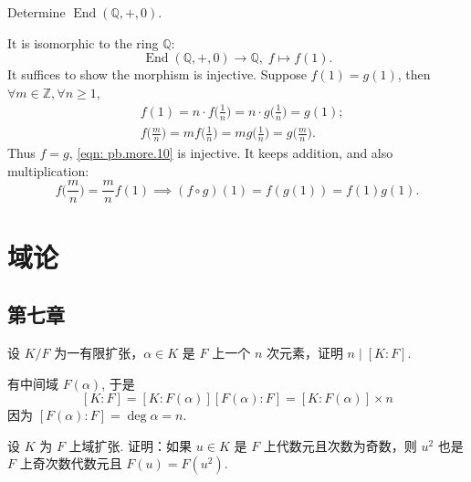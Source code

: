 \setcounter{pb}{10}
\begin{problem}
    Determine $\operatorname{End}(\mathbb{Q},+,0)$.
\end{problem}

\begin{solution}
    It is isomorphic to the ring $\mathbb{Q}$:
        \begin{equation}
            \label{eqn: pb.more.10}
            \operatorname{End}(\mathbb{Q},+,0) \to \mathbb{Q},\; f\mapsto f(1). 
        \end{equation}
    It suffices to show the morphism is injective.  Suppose $f(1)=g(1)$, then $\forall m\in\mathbb{Z},\forall n\geq1  $, 
        \[
            \begin{split}
                & f(1)=n\cdot f\Big(\frac{1}{n}\Big)=n\cdot g\Big(\frac{1}{n}\Big)=g(1);\\
                & f\Big(\frac{m}{n}\Big)=m f\Big(\frac{1}{n}\Big)=m g\Big(\frac{1}{n}\Big)=g\Big(\frac{m}{n}\Big).
            \end{split}
        \]
    Thus $f=g$, \eqref{eqn: pb.more.10} is injective. 
    It keeps addition, and also multiplication:
        \[
            f\Big(\frac{m}{n}\Big)=\frac{m}{n}f(1)\implies(f\circ g)(1)=f( g(1) )=f(1) g(1).
        \]
\end{solution}

\section{域论}
\subsection{第七章}

\setcounter{pb}{2}
\begin{problem}
    设 $ K/F $ 为一有限扩张，$ \alpha \in K $ 是 $ F $ 上一个 $ n $ 次元素，证明 $ n \mid [K : F] $.
\end{problem}

\begin{solution}
    有中间域 $F(\alpha) $, 于是 
        \[
            [K:F]=[K:F(\alpha)][F(\alpha):F]=[K:F(\alpha)]\times n
        \]
    因为 $[F(\alpha):F]=\deg\alpha=n$.
\end{solution}

\setcounter{pb}{4}
\begin{problem}
    设 $ K $ 为 $ F $ 上域扩张. 证明：如果 $ u \in K $ 是 $ F $ 上代数元且次数为奇数，则 $ u^2 $ 也是 $ F $ 上奇次数代数元且 $ F(u) = F(u^2) $.
\end{problem}

